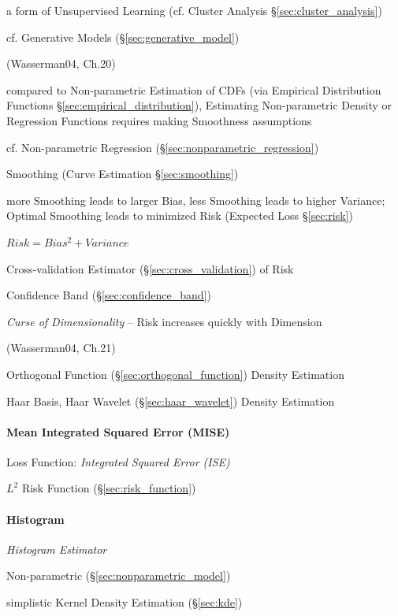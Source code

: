 a form of Unsupervised Learning (cf. Cluster Analysis
\S\ref{sec:cluster_analysis})

\fist cf. Generative Models (\S\ref{sec:generative_model})

(Wasserman04, Ch.20)

compared to Non-parametric Estimation of CDFs (via Empirical Distribution
Functions \S\ref{sec:empirical_distribution}), Estimating Non-parametric Density
or Regression Functions requires making Smoothness assumptions

cf. Non-parametric Regression (\S\ref{sec:nonparametric_regression})

Smoothing (Curve Estimation \S\ref{sec:smoothing})

more Smoothing leads to larger Bias, less Smoothing leads to higher Variance;
Optimal Smoothing leads to minimized Risk (Expected Loss \S\ref{sec:risk})

$Risk = Bias^2 + Variance$

Cross-validation Estimator (\S\ref{sec:cross_validation}) of Risk

Confidence Band (\S\ref{sec:confidence_band})

\emph{Curse of Dimensionality} -- Risk increases quickly with Dimension

(Wasserman04, Ch.21)

Orthogonal Function (\S\ref{sec:orthogonal_function}) Density Estimation

Haar Basis, Haar Wavelet (\S\ref{sec:haar_wavelet}) Density
Estimation



\paragraph{Mean Integrated Squared Error (MISE)}\label{sec:mise}\hfill

Loss Function: \emph{Integrated Squared Error (ISE)}

$L^2$ Risk Function (\S\ref{sec:risk_function})



\paragraph{Histogram}\label{sec:histogram}\hfill

\emph{Histogram Estimator}

Non-parametric (\S\ref{sec:nonparametric_model})

simplistic Kernel Density Estimation (\S\ref{sec:kde})

